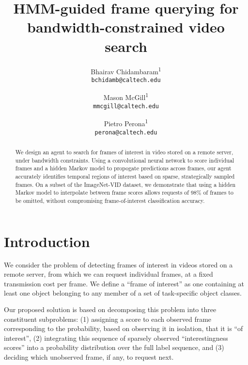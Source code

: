 \documentclass[10pt,twocolumn,letterpaper]{article}
\begin{document}
\title{HMM-guided frame querying for bandwidth-constrained video search}

\author{
    Bhairav Chidambaram\textsuperscript{1} \\
    {\tt\small bchidamb@caltech.edu}
    \and
    Mason McGill\textsuperscript{1} \\
    {\tt\small mmcgill@caltech.edu}
    \and
    Pietro Perona\textsuperscript{1} \\
    {\tt\small perona@caltech.edu}
}

\maketitle

\begin{abstract}
    We design an agent to search for frames of interest in video stored on a remote server, under bandwidth constraints. Using a convolutional neural network to score individual frames and a hidden Markov model to propogate predictions across frames, our agent accurately identifies temporal regions of interest based on sparse, strategically sampled frames. On a subset of the ImageNet-VID dataset, we demonstrate that using a hidden Markov model to interpolate between frame scores allows requests of 98\% of frames to be omitted, without compromising frame-of-interest classification accuracy.
\end{abstract}


\section{Introduction}

We consider the problem of detecting frames of interest in videos stored on a remote server, from which we can request individual frames, at a fixed transmission cost per frame. We define a ``frame of interest'' as one containing at least one object belonging to any member of a set of task-specific object classes.

Our proposed solution is based on decomposing this problem into three constituent subproblems: (1) assigning a score to each observed frame corresponding to the probability, based on observing it in isolation, that it is ``of interest'', (2) integrating this sequence of sparsely observed ``interestingness scores'' into a probability distribution over the full label sequence, and (3) deciding which unobserved frame, if any, to request next.
\end{document}
